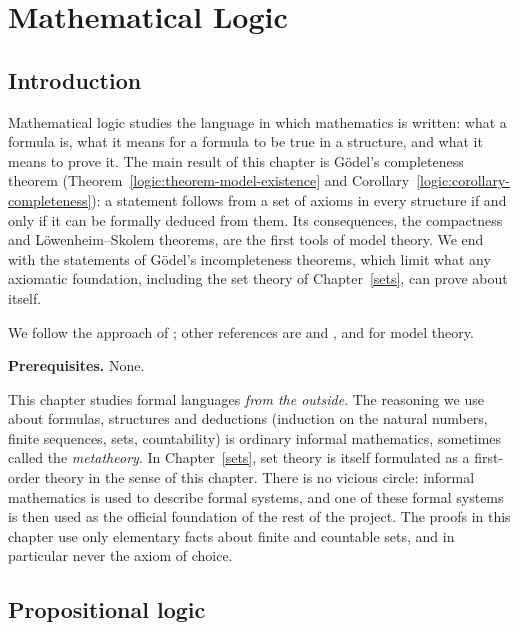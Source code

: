 \chapter{Mathematical Logic}\label{logic}

\section{Introduction}\label{logic:section-introduction}

Mathematical logic studies the language in which mathematics is written: what
a formula is, what it means for a formula to be true in a structure, and what
it means to prove it. The main result of this chapter is G\"odel's completeness
theorem (Theorem~\ref{logic:theorem-model-existence} and
Corollary~\ref{logic:corollary-completeness}): a statement follows from a set
of axioms in every structure if and only if it can be formally deduced from
them. Its consequences, the compactness and L\"owenheim--Skolem theorems, are
the first tools of model theory. We end with the statements of G\"odel's
incompleteness theorems, which limit what any axiomatic foundation, including
the set theory of Chapter~\ref{sets}, can prove about itself.

We follow the approach of \cite{enderton-logic}; other references are
\cite{shoenfield-logic} and \cite{vandalen-logic}, and \cite{chang-keisler} for
model theory.

\noindent\textbf{Prerequisites.} None.

\begin{remark}\label{logic:remark-metatheory}
This chapter studies formal languages \emph{from the outside}. The reasoning
we use about formulas, structures and deductions (induction on the natural
numbers, finite sequences, sets, countability) is ordinary informal
mathematics, sometimes called the \emph{metatheory}. In
Chapter~\ref{sets}, set theory is itself formulated as a first-order theory
in the sense of this chapter. There is no vicious circle: informal
mathematics is used to describe formal systems, and one of these formal
systems is then used as the official foundation of the rest of the project.
The proofs in this chapter use only elementary facts about finite and
countable sets, and in particular never the axiom of choice.
\end{remark}

\section{Propositional logic}\label{logic:section-propositional}

